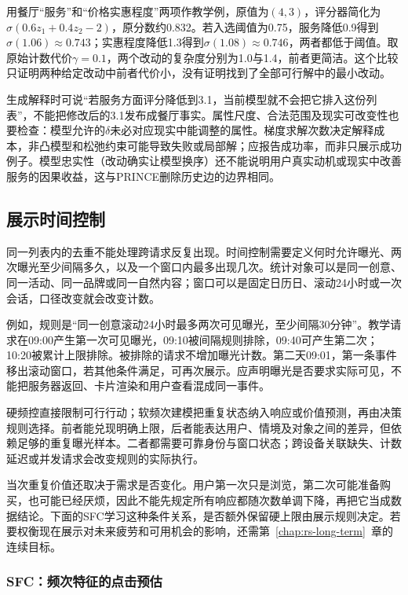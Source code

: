 用餐厅“服务”和“价格实惠程度”两项作教学例，原值为$(4,3)$，评分器简化为$\sigma(0.6z_1+0.4z_2-2)$，原分数约0.832。若入选阈值为0.75，服务降低0.9得到$\sigma(1.06)\approx0.743$；实惠程度降低1.3得到$\sigma(1.08)\approx0.746$，两者都低于阈值。取原始计数代价$\gamma=0.1$，两个改动的复杂度分别为1.0与1.4，前者更简洁。这个比较只证明两种给定改动中前者代价小，没有证明找到了全部可行解中的最小改动。

生成解释时可说“若服务方面评分降低到3.1，当前模型就不会把它排入这份列表”，不能把修改后的3.1发布成餐厅事实。属性尺度、合法范围及现实可改变性也要检查：模型允许的$\delta$未必对应现实中能调整的属性。梯度求解次数决定解释成本，非凸模型和松弛约束可能导致失败或局部解；应报告成功率，而非只展示成功例子。模型忠实性（改动确实让模型换序）还不能说明用户真实动机或现实中改善服务的因果收益，这与PRINCE删除历史边的边界相同。

\subsection{展示时间控制}
\label{sec:rs-presentation-time}

同一列表内的去重不能处理跨请求反复出现。时间控制需要定义何时允许曝光、两次曝光至少间隔多久，以及一个窗口内最多出现几次。统计对象可以是同一创意、同一活动、同一品牌或同一自然内容；窗口可以是固定日历日、滚动24小时或一次会话，口径改变就会改变计数。

例如，规则是“同一创意滚动24小时最多两次可见曝光，至少间隔30分钟”。教学请求在09:00产生第一次可见曝光，09:10被间隔规则排除，09:40可产生第二次；10:20被累计上限排除。被排除的请求不增加曝光计数。第二天09:01，第一条事件移出滚动窗口，若其他条件满足，可再次展示。应声明曝光是否要求实际可见，不能把服务器返回、卡片渲染和用户查看混成同一事件。

硬频控直接限制可行行动；软频次建模把重复状态纳入响应或价值预测，再由决策规则选择。前者能兑现明确上限，后者能表达用户、情境及对象之间的差异，但依赖足够的重复曝光样本。二者都需要可靠身份与窗口状态；跨设备关联缺失、计数延迟或并发请求会改变规则的实际执行。

当次重复价值还取决于需求是否变化。用户第一次只是浏览，第二次可能准备购买，也可能已经厌烦，因此不能先规定所有响应都随次数单调下降，再把它当成数据结论。下面的SFC学习这种条件关系，是否额外保留硬上限由展示规则决定。若要权衡现在展示对未来疲劳和可用机会的影响，还需第~\ref{chap:rs-long-term}~章的连续目标。

\Needspace{90mm}
\subsubsection{SFC：频次特征的点击预估}
\label{sec:rs-sfc}


